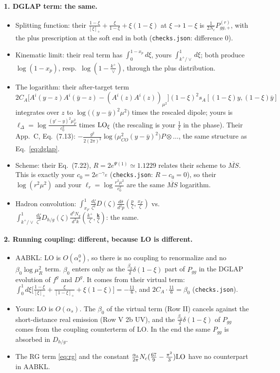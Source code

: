 \documentclass[9pt]{article}
\numberwithin{equation}{section}
\begin{document}
\paragraph{1. DGLAP term: the same.}
\begin{itemize}
\item Splitting function: their $\frac{1-\xi}{[\xi]_+}+\frac{\xi}{1-\xi}+\xi(1-\xi)$ at $\xi\to1-\xi$ is $\frac{1}{2N_c}P^{(r)}_{gg,+}$, with the plus prescription at the soft end in both (\texttt{checks.json}: difference $0$).
\item Kinematic limit: their real term has $\int_0^{1-x_p}d\xi$, yours $\int_{k^+/\vee}^1d\xi$; both produce $\log(1-x_p)$, resp.\ $\log(1-\frac{k^+}{\vee})$, through the plus distribution.
\item The logarithm: their after-target term $2C_A\big[A^i(y-z)A^i(\bar y-z)-(A^i(z)A^i(z))_{\mu^2}\big](1-\xi)^2s_A[(1-\xi)y,(1-\xi)\bar y]$ integrates over $z$ to $\log\big((y-\bar y)^2\mu^2\big)$ times the rescaled dipole; yours is $\ell_\Delta=\log\frac{(y'-y)^2\mu_F^2}{c_0^2}$ times ${\rm LO}_\xi$ (the rescaling is your $\frac1\xi$ in the phase). Their App.~C, Eq.~(7.13): $-\frac{g^2}{2(2\pi)^2}\log\big(\mu^2_{CO}(y-\bar y)^2\big)P\otimes\dots$, the same structure as Eq.~\eqref{eq:dglap}.
\item Scheme: their Eq.~(7.22), $R=2e^{\Psi(1)}\simeq1.1229$ relates their scheme to $\overline{MS}$. This is exactly your $c_0=2e^{-\gamma_E}$ (\texttt{checks.json}: $R-c_0=0$), so their $\log(r^2\mu^2)$ and your $\ell_r=\log\frac{r^2\mu^2}{c_0^2}$ are the same $\overline{MS}$ logarithm.
\item Hadron convolution: $\int_{x_F}^1\frac{d\zeta}{\zeta^2}D(\zeta)\frac{d\bar\sigma}{d^2p}(\frac{p}{\zeta},\frac{x_F}{\zeta})$ vs.\ $\int_{k^+/\vee}^1\frac{d\zeta}{\zeta^3}D_{h/g}(\zeta)\frac{d^3N_g}{d^3k}(\frac{k^+}{\zeta},\frac{\mathbf k}{\zeta})$: the same.
\end{itemize}

\paragraph{2. Running coupling: different, because LO is different.}
\begin{itemize}
\item AABKL: LO is $O(\alpha_s^0)$, so there is no coupling to renormalize and no $\beta_0\log\mu_R^2$ term. $\beta_0$ enters only as the $\frac{\beta_0}{2}\delta(1-\xi)$ part of $P_{gg}$ in the DGLAP evolution of $f^g$ and $D^g$. It comes from their virtual term: $\int_0^1d\xi\big[\frac{1-\xi}{[\xi]_+}+\frac{\xi}{[1-\xi]_+}+\xi(1-\xi)\big]=-\frac{11}{6}$, and $2C_A\cdot\frac{11}{6}=\beta_0$ (\texttt{checks.json}).
\item Yours: LO is $O(\alpha_s)$. The $\beta_0$ of the virtual term (Row II) cancels against the short-distance real emission (Row V 2b UV), and the $\frac{\beta_0}{2}\delta(1-\xi)$ of $P_{gg}$ comes from the coupling counterterm of LO. In the end the same $P_{gg}$ is absorbed in $D_{h/g}$.
\item The RG term \eqref{eq:rg} and the constant $\frac{\alpha_s}{2\pi}N_c(\frac{67}{9}-\frac{\pi^2}{3}){\rm LO}$ have no counterpart in AABKL.
\end{itemize}
\end{document}
